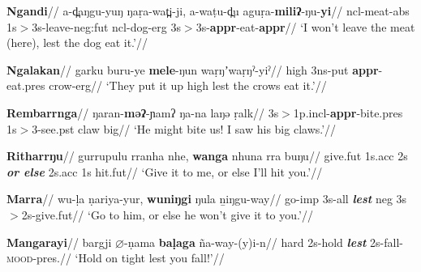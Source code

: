 \a\begingl\glpreamble \textbf{Ngandi}//
\gla a-d̪aŋgu-yuŋ ŋaṛa-wat̪i-ji, a-waṭu-d̪u aguṛa-\textbf{miliʔ}-ŋu-\textbf{yi}//
\glb \gls{ncl}-meat-\gls{abs} 1s$\scriptscriptstyle>$3s-leave-\gls{neg}:\gls{fut} \gls{ncl}-dog-\gls{erg} 3s$\scriptscriptstyle>$3s-\textbf{\gls{appr}}-eat-\textbf{\gls{appr}}//
\glft`I won't leave the meat (here), lest the dog eat it.'//
\endgl




\a \begingl\glpreamble \textbf{Ngalakan}//
\gla garku buru-ye \textbf{mele}-ŋun waṛŋʼwaṛŋˀ-yiˀ//
\glb high 3ns-put \textbf{\gls{appr}}-eat.\gls{pres} crow-\gls{erg}//
\glft`They put it up high lest the crows eat it.'//
\endgl

\a \begingl\glpreamble \textbf{Rembarrnga}//
\gla ŋaran-\textbf{mǝʔ}-ɲamʔ ŋa-na laŋǝ ṛalk//
\glb 3s$\scriptscriptstyle>$1p.\gls{incl}-\textbf{\gls{appr}}-bite.\gls{pres} 1s$\scriptscriptstyle>$3-see.\gls{pst} claw big//
\glft`He might bite us! I saw his big claws.'//
\endgl



\a\begingl\glpreamble\textbf{Ritharrŋu}//
\gla gurrupulu rranha nhe, \textbf{wanga} nhuna rra buŋu//
\glb give.\gls{fut} 1s.\gls{acc} 2s \textbf{\textit{or else}} 2s.\gls{acc} 1s hit.\gls{fut}//
\glft`Give it to me, or else I'll hit you.'//\endgl



\a\begingl\glpreamble \textbf{Marra}//
\gla wu-ḷa ṇariya-yur, \textbf{wuniŋgi} ŋula ṉiŋgu-way//
\glb go-\gls{imp} 3s-\gls{all} \textit{\textbf{lest}} \gls{neg} 3s$\scriptscriptstyle>$2s-give.\gls{fut}//
\glft`Go to him, or else he won't give it to you.'//\endgl
 
\a\begingl\glpreamble \textbf{Mangarayi}//
\gla bargji $\varnothing$-ṇama \textbf{baḷaga} ña-way-(y)i-n//
\glb hard 2s-hold \textsl{\textbf{lest}} 2s-fall-\textsc{mood}-\gls{pres}.//
\glft`Hold on tight lest you  fall!'//
\endgl


\xe



